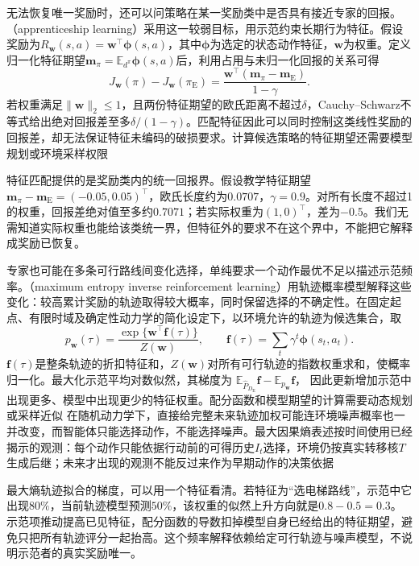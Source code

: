 无法恢复唯一奖励时，还可以问策略在某一奖励类中是否具有接近专家的回报。（apprenticeship learning）采用这一较弱目标，用示范约束长期行为特征。假设奖励为$R_{\bm w}(s,a)=\bm w^\top\bm\phi(s,a)$，其中$\bm\phi$为选定的状态动作特征，$\bm w$为权重。定义归一化特征期望$\bm m_\pi=\mathbb E_{d^\pi}\bm\phi(s,a)$后，利用占用与未归一化回报的关系可得
\begin{equation}
  J_{\bm w}(\pi)-J_{\bm w}(\pi_{\mathrm E})
  =\frac{\bm w^\top(\bm m_\pi-\bm m_{\mathrm E})}{1-\gamma}.
  \label{eq:rl-reward-feature}
\end{equation}
若权重满足$\lVert\bm w\rVert_2\leq1$，且两份特征期望的欧氏距离不超过$\delta$，Cauchy--Schwarz不等式给出绝对回报差至多$\delta/(1-\gamma)$。匹配特征因此可以同时控制这类线性奖励的回报差，却无法保证特征未编码的破损要求。计算候选策略的特征期望还需要模型规划或环境采样权限

特征匹配提供的是奖励类内的统一回报界。假设教学特征期望$\bm m_\pi-\bm m_{\mathrm E}=(-0.05,0.05)^\top$，欧氏长度约为$0.0707$，$\gamma=0.9$。对所有长度不超过1的权重，回报差绝对值至多约$0.7071$；若实际权重为$(1,0)^\top$，差为$-0.5$。我们无需知道实际权重也能给该类统一界，但特征外的要求不在这个界中，不能把它解释成奖励已恢复。

专家也可能在多条可行路线间变化选择，单纯要求一个动作最优不足以描述示范频率。（maximum entropy inverse reinforcement learning）用轨迹概率模型解释这些变化：较高累计奖励的轨迹取得较大概率，同时保留选择的不确定性。在固定起点、有限时域及确定性动力学的简化设定下，以环境允许的轨迹为候选集合，取
\[
  p_{\bm w}(\tau)=\frac{\exp\{\bm w^\top\bm f(\tau)\}}{Z(\bm w)},
  \qquad \bm f(\tau)=\sum_t\gamma^t\bm\phi(s_t,a_t).
\]
$\bm f(\tau)$是整条轨迹的折扣特征和，$Z(\bm w)$对所有可行轨迹的指数权重求和，使概率归一化。最大化示范平均对数似然，其梯度为
$\mathbb E_{\widehat P_{D_{\mathrm E}}}\bm f-\mathbb E_{p_{\bm w}}\bm f$，
因此更新增加示范中出现更多、模型中出现更少的特征权重。配分函数和模型期望的计算需要动态规划或采样近似
在随机动力学下，直接给完整未来轨迹加权可能连环境噪声概率也一并改变，而智能体只能选择动作，不能选择噪声。最大因果熵表述按时间使用已经揭示的观测：每个动作只能依据行动前的可得历史$I_t$选择，环境仍按真实转移核$T$生成后继；未来才出现的观测不能反过来作为早期动作的决策依据

最大熵轨迹拟合的梯度，可以用一个特征看清。若特征为“选电梯路线”，示范中它出现$80\%$，当前轨迹模型预测$50\%$，该权重的似然上升方向就是$0.8-0.5=0.3$。示范项推动提高已见特征，配分函数的导数扣掉模型自身已经给出的特征期望，避免只把所有轨迹评分一起抬高。这个频率解释依赖给定可行轨迹与噪声模型，不说明示范者的真实奖励唯一。

